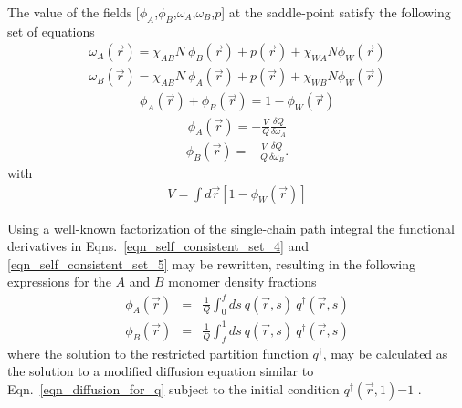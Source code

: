 \documentclass[onecolumn,amsmath,amssymb,floatfix]{elsart}
\begin{document}
The value of
the fields [$\phi_A$,$\phi_B$,$\omega_A$,$\omega_B$,$p$] at the
saddle-point satisfy the following set of equations
%
 \begin{eqnarray}
   \label{eqn_self_consistent_set_1}
   \omega_A({\vec r}) =
   \chi_{AB} N \ \phi_B({\vec r}) + p({\vec r}) + \chi_{WA} N \phi_W({\vec r})
 \end{eqnarray}
%
 \begin{eqnarray}
   \label{eqn_self_consistent_set_2}
   \omega_B({\vec r}) = 
   \chi_{AB} N \ \phi_A({\vec r}) + p({\vec r}) + \chi_{WB} N \phi_W({\vec r})
 \end{eqnarray}
%
 \begin{eqnarray}
   \label{eqn_self_consistent_set_3}
   \phi_A({\vec r}) + \phi_B({\vec r}) = 1 - \phi_W({\vec r})
 \end{eqnarray}
%
 \begin{eqnarray}
   \label{eqn_self_consistent_set_4}
   \phi_A({\vec r}) = - \frac{V}{Q} \frac{\delta Q}{\delta \omega_A}
 \end{eqnarray}
%
 \begin{eqnarray}
   \label{eqn_self_consistent_set_5}
   \phi_B({\vec r}) = - \frac{V}{Q} \frac{\delta Q}{\delta \omega_B} .
 \end{eqnarray}
%
with
 \begin{eqnarray}
  V = \int d{\vec r} \left [ 1 - \phi_W({\vec r}) \right ]
 \end{eqnarray}

\pagebreak


Using a well-known factorization of the single-chain path integral
\cite{freed72,feynman_hibbs65_book,helfand74} the functional derivatives in
Eqns.~\ref{eqn_self_consistent_set_4} and \ref{eqn_self_consistent_set_5}
may be rewritten, resulting in the following expressions for the $A$ and $B$
monomer density fractions
%
 \begin{eqnarray}
   \label{eqn_density_A}
   \phi_A({\vec r})
   & = &
   \frac{1}{Q} \int_0^f ds \ q({\vec r},s) \ q^\dagger({\vec r},s) \\
   \label{eqn_density_B}
   \phi_B({\vec r})
   & = &
   \frac{1}{Q} \int_f^1 ds \ q({\vec r},s) \ q^\dagger({\vec r},s)
 \end{eqnarray}
%
where the solution to the restricted partition function $q^\dagger$,
may be calculated as the solution to a modified diffusion equation similar
to Eqn.~\ref{eqn_diffusion_for_q} subject to the initial condition
$q^\dagger({\vec r},1)$=$1$ \cite{matsen_schick94}.
\end{document}
